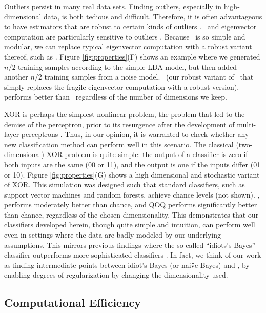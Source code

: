 \documentclass[10pt]{article}
\begin{document}
  Outliers persist in many real data sets.  Finding outliers, especially in high-dimensional data, is both tedious and difficult.  Therefore, it is often advantageous to have estimators that are robust to certain kinds of outliers \cite{Huber1981,Rousseeuw1999,Qin2013a}.  \Pca~and eigenvector computation are particularly sensitive to outliers \cite{Candes2009a}.  Because \Lol~is so simple and modular, we can replace typical eigenvector computation with a robust variant thereof, such as \cite{Zhang2014}.  Figure \ref{fig:properties}(F) shows an example where we generated  $n/2$ training samples according to the simple LDA model, but then added another $n/2$ training samples from a noise model.  \Lrl~(our robust variant of \Lol~that simply replaces the fragile eigenvector computation with a robust version), performs better than \Lol~regardless of the number of dimensions we keep.

  XOR is perhaps the simplest nonlinear problem, the problem that led to the demise of the perceptron, prior to its resurgence after the development of multi-layer perceptrons \cite{Bishop2006}.  Thus, in our opinion, it is warranted to check whether any new classification method can perform well in this scenario.  The classical (two-dimensional) XOR problem is quite simple: the output of a classifier is zero if both inputs are the same (00 or 11), and the output is one if the inputs differ (01 or 10).  Figure \ref{fig:properties}(G) shows a high dimensional and stochastic variant of XOR.  This simulation was designed such that standard classifiers, such as support vector machines and random forests, achieve chance levels (not shown).  \Lol, performs moderately better than chance, and QOQ performs significantly better than chance, regardless of the chosen dimensionality.  This demonstrates that our classifiers developed herein, though quite simple and intuition, can perform well even in settings where the data are badly modeled by our underlying assumptions.  This mirrors previous findings where the so-called ``idiots's Bayes'' classifier outperforms more sophisticated classifiers \cite{Bickel2004}.  In fact, we think of our work as finding intermediate points between idiot's Bayes (or nai\"ve Bayes) and \Fld, by enabling degrees of regularization by changing the dimensionality used.


\subsection*{Computational Efficiency}
\end{document}
